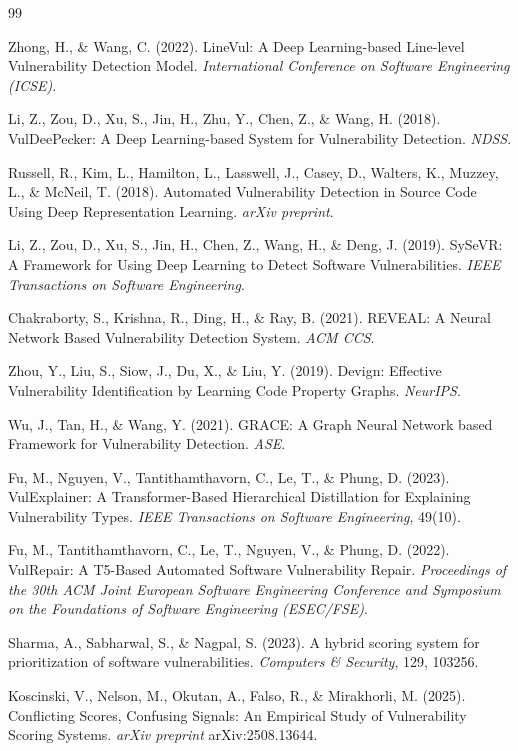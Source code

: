 \clearpage
\listoffigures
\listoftables
\clearpage
{}
\begin{thebibliography}{99}

Zhong, H., \& Wang, C. (2022). LineVul: A Deep Learning-based Line-level Vulnerability Detection Model. \textit{International Conference on Software Engineering (ICSE)}.

Li, Z., Zou, D., Xu, S., Jin, H., Zhu, Y., Chen, Z., \& Wang, H. (2018). VulDeePecker: A Deep Learning-based System for Vulnerability Detection. \textit{NDSS}.

Russell, R., Kim, L., Hamilton, L., Lasswell, J., Casey, D., Walters, K., Muzzey, L., \& McNeil, T. (2018). Automated Vulnerability Detection in Source Code Using Deep Representation Learning. \textit{arXiv preprint}.

Li, Z., Zou, D., Xu, S., Jin, H., Chen, Z., Wang, H., \& Deng, J. (2019). SySeVR: A Framework for Using Deep Learning to Detect Software Vulnerabilities. \textit{IEEE Transactions on Software Engineering}.

Chakraborty, S., Krishna, R., Ding, H., \& Ray, B. (2021). REVEAL: A Neural Network Based Vulnerability Detection System. \textit{ACM CCS}.

Zhou, Y., Liu, S., Siow, J., Du, X., \& Liu, Y. (2019). Devign: Effective Vulnerability Identification by Learning Code Property Graphs. \textit{NeurIPS}.

Wu, J., Tan, H., \& Wang, Y. (2021). GRACE: A Graph Neural Network based Framework for Vulnerability Detection. \textit{ASE}.

Fu, M., Nguyen, V., Tantithamthavorn, C., Le, T., \& Phung, D. (2023). VulExplainer: A Transformer-Based Hierarchical Distillation for Explaining Vulnerability Types. \textit{IEEE Transactions on Software Engineering}, 49(10).

Fu, M., Tantithamthavorn, C., Le, T., Nguyen, V., \& Phung, D. (2022). VulRepair: A T5-Based Automated Software Vulnerability Repair. \textit{Proceedings of the 30th ACM Joint European Software Engineering Conference and Symposium on the Foundations of Software Engineering (ESEC/FSE)}.

Sharma, A., Sabharwal, S., \& Nagpal, S. (2023). A hybrid scoring system for prioritization of software vulnerabilities. \textit{Computers \& Security}, 129, 103256.

Koscinski, V., Nelson, M., Okutan, A., Falso, R., \& Mirakhorli, M. (2025). Conflicting Scores, Confusing Signals: An Empirical Study of Vulnerability Scoring Systems. \textit{arXiv preprint} arXiv:2508.13644.

\end{thebibliography}
